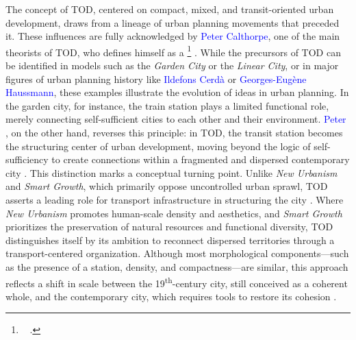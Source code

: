 \begin{refsegment}
The concept of \acrshort{TOD}, centered on compact, mixed, and transit-oriented urban development, draws from a lineage of urban planning movements that preceded it. These influences are fully acknowledged by \textcolor{blue}{Peter Calthorpe}, one of the main theorists of \acrshort{TOD}, who defines himself as a \footnote{~
     \textcolor{blue}{\autocite[5]{newman_focus_1991}}.
} \textcolor{blue}{\autocite[5]{newman_focus_1991}}. While the precursors of \acrshort{TOD} can be identified in models such as the \textsl{Garden City} or the \textsl{Linear City}, or in major figures of urban planning history like \textcolor{blue}{Ildefons Cerdà} or \textcolor{blue}{Georges-Eugène Haussmann}, these examples illustrate the evolution of ideas in urban planning. In the garden city, for instance, the train station plays a limited functional role, merely connecting self-sufficient cities to each other and their environment. \textcolor{blue}{Peter} \textcolor{blue}{\textcite[43-49]{calthorpe_next_1993}}, on the other hand, reverses this principle: in \acrshort{TOD}, the transit station becomes the structuring center of urban development, moving beyond the logic of self-sufficiency to create connections within a fragmented and dispersed contemporary city \textcolor{blue}{\autocite[51]{el_hadeuf_ville_2017}}. This distinction marks a conceptual turning point. Unlike \textsl{New Urbanism} and \textsl{Smart Growth}, which primarily oppose uncontrolled urban sprawl, \acrshort{TOD} asserts a leading role for transport infrastructure in structuring the city \textcolor{blue}{\autocite[51]{el_hadeuf_ville_2017}}. Where \textsl{New Urbanism} promotes human-scale density and aesthetics, and \textsl{Smart Growth} prioritizes the preservation of natural resources and functional diversity, \acrshort{TOD} distinguishes itself by its ambition to reconnect dispersed territories through a transport-centered organization. Although most morphological components—such as the presence of a station, density, and compactness—are similar, this approach reflects a shift in scale between the 19\textsuperscript{th}-century city, still conceived as a coherent whole, and the contemporary city, which requires tools to restore its cohesion \textcolor{blue}{\autocite[37]{leysens_reconfiguration_2011}}.%


\end{refsegment}
